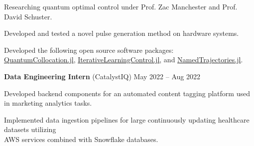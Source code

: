 \documentclass[9pt]{extarticle}
\begin{document}
\begin{compactitem}
\item Researching quantum optimal control under Prof. Zac Manchester and Prof. David Schuster.  
\item Developed and tested a novel pulse generation method on hardware systems. 
\item Developed the following open source software packages: \\ \href{https://github.com/aarontrowbridge/QuantumCollocation.jl}{QuantumCollocation.jl}, \href{https://github.com/aarontrowbridge/IterativeLearningControl.jl}{IterativeLearningControl.jl}, and \href{https://github.com/aarontrowbridge/NamedTrajectories.jl}{NamedTrajectories.jl}. 
\normalsize
\end{compactitem}





\vspace{7pt}
\large\textbf{Data Engineering Intern} \normalsize (CatalystIQ) \hfill \small May 2022 -- Aug 2022 

\begin{compactitem}
  \normalsize
\item Developed backend components for an automated content tagging platform used in marketing analytics tasks.
\item Implemented data ingestion pipelines for large continuously updating healthcare datasets utilizing \\ AWS services combined with Snowflake databases. 
\end{compactitem}
\end{document}
